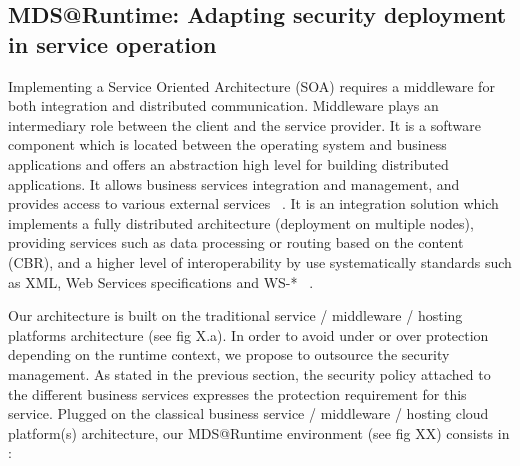 \documentclass[runningheads,a4paper]{llncs}
\begin{document}
\subsection{MDS@Runtime: Adapting security deployment in service operation}

Implementing a Service Oriented Architecture (SOA) requires a middleware for both integration and distributed communication. Middleware plays an intermediary role between the client and the service provider. It is a software component which is located between the operating system and business applications and offers an abstraction high level for building distributed applications. It allows business services integration and management, and provides access to various external services ~\cite{SHLP05}. It is an integration solution which implements a fully distributed architecture (deployment on multiple nodes), providing services such as data processing or routing based on the content (CBR), and a higher level of interoperability by use systematically standards such as XML, Web Services specifications and WS-* ~\cite{Lou08}.
 

Our architecture is built on the traditional service / middleware / hosting platforms architecture (see fig X.a). In order to avoid under or over protection depending on the runtime context, we propose to outsource the security management. As stated in the previous section, the security policy attached to the different business services expresses the protection requirement for this service. Plugged on the classical business service / middleware / hosting cloud platform(s) architecture, our MDS@Runtime environment (see fig XX) consists in :
\end{document}
